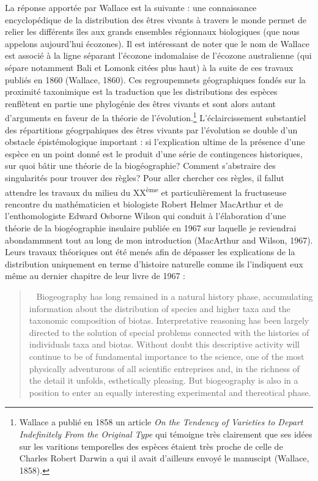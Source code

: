 La réponse apportée par Wallace est la suivante : une connaissance
encyclopédique de la distribution des êtres vivants à travers le monde
permet de relier les différents îles aux grands ensembles régionnaux
biologiques (que nous appelons aujourd'hui écozones). Il est intéressant
de noter que le nom de Wallace est associé à la ligne séparant l'écozone
indomalaise de l'écozone australienne (qui sépare notamment Bali et
Lomonk citées plus haut) à la suite de ces travaux publiés en 1860
(Wallace, 1860). Ces regroupemnets géographiques fondés sur la proximité
taxonimique est la traduction que les distributions des espèces
renflètent en partie une phylogénie des êtres vivants et sont alors
autant d'arguments en faveur de la théorie de l'évolution.\footnote{Wallace
  a publié en 1858 un article \emph{On the Tendency of Varieties to
  Depart Indefinitely From the Original Type} qui témoigne très
  clairement que ses idées sur les varitions temporelles des espèces
  étaient très proche de celle de Charles Robert Darwin a qui il avait
  d'ailleurs envoyé le manuscipt (Wallace, 1858).} L'éclaircissement
substantiel des répartitions géogrpahiques des êtres vivants par
l'évolution se double d'un obstacle épistémologique important : si
l'explication ultime de la présence d'une espèce en un point donné est
le produit d'une série de contingences historiques, sur quoi bâtir une
théorie de la biogéographie? Comment s'abstraire des singularités pour
trouver des règles? Pour aller chercher ces règles, il fallut attendre
les travaux du milieu du XX\textsuperscript{ème} et particulièrement la
fructuseuse rencontre du mathématicien et biologiste Robert Helmer
MacArthur et de l'enthomologiste Edward Osborne Wilson qui conduit à
l'élaboration d'une théorie de la biogéographie insulaire publiée en
1967 sur laquelle je reviendrai abondammnent tout au long de mon
introduction (MacArthur and Wilson, 1967). Leurs travaux théoriques ont
été menés afin de dépasser les explications de la distribution
uniquement en terme d'histoire naturelle comme ils l'indiquent eux même
au dernier chapitre de leur livre de 1967 :

\begin{quote}
\guillemotleft ~ Biogeography has long remained in a natural history
phase, accumulating information about the distribution of species and
higher taxa and the taxonomic composition of biotas. Interpretative
reasoning has been largely directed to the solution of special problems
connected with the histories of individuals taxa and biotas. Without
doubt this descriptive activity will continue to be of fundamental
importance to the science, one of the most physically adventurous of all
scientific entreprises and, in the richness of the detail it unfolds,
esthetically pleasing. But biogeography is also in a position to enter
an equally interesting experimental and thereotical phase.
\guillemotright
\end{quote}


